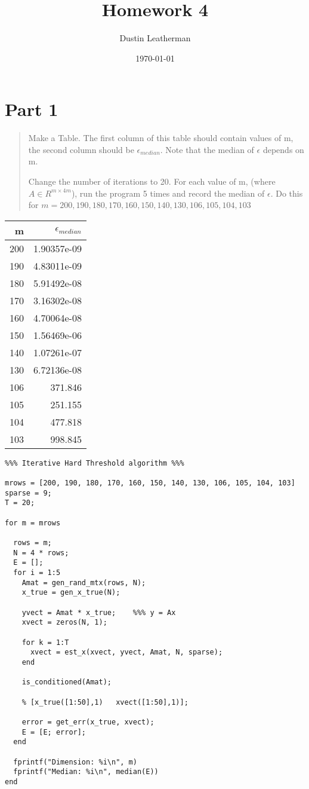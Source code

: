 \documentclass[11pt]{article}
\author{Dustin Leatherman}
\date{\today}
\title{Homework 4}
\begin{document}
\maketitle
\tableofcontents

\section{Part 1}
\label{sec:orgcd379cf}
\begin{quote}
Make a Table. The first column of this table should contain values of m, the
second column should be \(\epsilon_{median}\). Note that the median of \(\epsilon\)
depends on m.

Change the number of iterations to 20. For each value of m, (where \(A \in R^{m
\times 4m}\)), run the program 5 times and record the median of \(\epsilon\). Do
this for \(m = 200, 190, 180, 170, 160, 150, 140, 130, 106, 105, 104, 103\)
\end{quote}

\begin{center}
\begin{tabular}{rr}
m & \(\epsilon_{median}\)\\
\hline
200 & 1.90357e-09\\
190 & 4.83011e-09\\
180 & 5.91492e-08\\
170 & 3.16302e-08\\
160 & 4.70064e-08\\
150 & 1.56469e-06\\
140 & 1.07261e-07\\
130 & 6.72136e-08\\
106 & 371.846\\
105 & 251.155\\
104 & 477.818\\
103 & 998.845\\
\end{tabular}
\end{center}


\begin{verbatim}
%%% Iterative Hard Threshold algorithm %%%

mrows = [200, 190, 180, 170, 160, 150, 140, 130, 106, 105, 104, 103]
sparse = 9;
T = 20;

for m = mrows

  rows = m;
  N = 4 * rows;
  E = [];
  for i = 1:5
    Amat = gen_rand_mtx(rows, N);
    x_true = gen_x_true(N);

    yvect = Amat * x_true;    %%% y = Ax
    xvect = zeros(N, 1);

    for k = 1:T
      xvect = est_x(xvect, yvect, Amat, N, sparse);
    end

    is_conditioned(Amat);

    % [x_true([1:50],1)   xvect([1:50],1)];

    error = get_err(x_true, xvect);
    E = [E; error];
  end

  fprintf("Dimension: %i\n", m)
  fprintf("Median: %i\n", median(E))
end
\end{verbatim}
\end{document}
